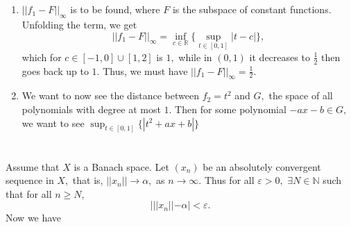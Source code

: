 \documentclass{article}
\begin{document}
\section{} %
\begin{enumerate}
	\item $||f_1-F||_{\infty}$ is to be found, where $F$ is the subspace of constant functions. Unfolding the term, we get 
	$$||f_1-F||_{\infty}= \inf_{c \in \mathbb{R} }\{ \sup_{t \in [0,1]} |t-c|  \},$$ which for $c \in [-1,0] \cup [1,2] $ is $1,$ while in $(0,1)$ it 
	decreases to $\frac{1}{2}$ then goes back up to $1.$ Thus, we must have $||f_1-F||_{\infty}=\frac{1}{2}.$
	\item We want to now see the distance between $f_2=t^2$ and $G,$ the space of all polynomials with degree at most $1.$ Then for some polynomial $-ax-b 
	\in G,$ we want to see $\sup_{t \in [0,1]}\{|t^2+ax+b|\}$ 
\end{enumerate}
\section{} %
\section{} %
Assume that $X$ is a Banach space. Let $(x_n)$ be an absolutely convergent sequence in $X,$ that is, $||x_n||\rightarrow \alpha,$ as $n \to \infty.$ Thus 
for all $\varepsilon > 0,$ $\exists N \in \mathbb{N}$ such that for all $n \geq N,$ $$| ||x_n|| - \alpha| < \varepsilon.$$
Now we have $ $
\section{} %
\section{} %
\section{} %
\section{} %
\section{} %
\section{} %
\end{document}
